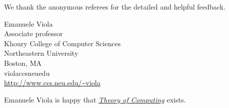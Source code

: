 \documentclass{toc}
\begin{document}
We thank the anonymous referees for the detailed and helpful feedback.


%
%

\begin{tocauthors}
\begin{tocinfo}[viola]
 Emanuele Viola\\
 Associate professor \\
 Khoury College of Computer Sciences\\
 Northeastern University\\
 Boston, MA\\
 viola\tocat{}ccs\tocdot{}neu\tocdot{}edu \\
 \url{http://www.ccs.neu.edu/~viola}
\end{tocinfo}

\end{tocauthors}

\begin{tocaboutauthors}
%
\begin{tocabout}[viola]  %
{\sc Emanuele Viola} 
is happy that
%
\href{https://theoryofcomputing.org}{\emph{Theory of Computing}} exists.
\end{tocabout}
\end{tocaboutauthors}
\end{document}

